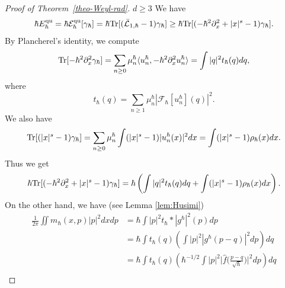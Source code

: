 \documentclass[%
11pt,  reqno]{amsart}
\theoremstyle{remarkstyle}
\newcommand{\1}{\hspace{0.2mm}\text{I}\hspace{0.2mm}}
\renewcommand{\L}{\mathcal{L}}
\newcommand{\jb}[1]
{\langle #1 \rangle}
\DeclareMathOperator*{\qua}{qu}
\numberwithin{equation}{section}
\numberwithin{theorem}{section}
\begin{document}
\begin{proof}[Proof of Theorem~\ref{theo-Weyl-rad}]
		$\boxed{d\geq 3}$ We have
		\begin{align}\label{boun-d-geq3-1}
			\hbar E^{\qua}_{\hbar} =\hbar \mathcal E^{\qua}_{\hbar}[\gamma_{\hbar}] = \hbar {\rm Tr}[(\bar{\L}_{1,\hbar}-1)\gamma_{\hbar}] \geq \hbar {\rm Tr}[(-\hbar^2\partial^2_x +|x|^s-1)\gamma_{\hbar}]. 
		\end{align}
		By Plancherel's identity, we compute
		\begin{align*}
			{\rm Tr}[-\hbar^2 \partial^2_x \gamma_{\hbar}] %
			= \sum_{n\geq 0} \mu_n^{\hbar} \jb{u^{\hbar}_n, -\hbar^2\partial^2_x u^{\hbar}_n}
			= \int |q|^2 t_\hbar(q)dq,
		\end{align*}
		where
		$$
		t_{\hbar}(q) =\sum_{n\geq 1} \mu_n^{\hbar} |\mathcal F_{\hbar}[u_n^{\hbar}] (q)|^2.
		$$
		We also have
		\begin{align*}
			{\rm Tr}[(|x|^s-1)\gamma_{\hbar}] %
			= \sum_{n\geq 0} \mu_n^{\hbar} \int (|x|^s-1)|u^{\hbar}_n(x)|^2 dx 
			= \int (|x|^s-1) \rho_{\hbar}(x)dx.  
		\end{align*}
		Thus we get
		\begin{align}\label{boun-d-geq3-2}
			\hbar {\rm Tr}[(-\hbar^2\partial^2_x +|x|^s-1)\gamma_{\hbar}] = \hbar \left(\int |q|^2 t_\hbar(q)dq + \int (|x|^s-1)\rho_{\hbar}(x) dx\right).
		\end{align}
		On the other hand, we have (see Lemma \ref{lem:Husimi})
		\begin{align*}
			\frac{1}{2\pi} \iint m_{\hbar}(x,p) |p|^2dxdp %
			&= \hbar \int |p|^2 t_{\hbar}\ast|g^{\hbar}|^2(p)dp \\
			&=\hbar \int t_{\hbar}(q) \left(\int |p|^2 |g^{\hbar}(p-q)|^2 dp\right) dq \\
			&= \hbar \int t_{\hbar}(q) \left(\hbar^{-1/2}\int |p|^2 \Big|\hat{f}\Big(\frac{p-q}{\sqrt{\hbar}}\Big) \Big|^2 dp \right) dq \\

\end{align*}
\end{proof}
\end{document}
